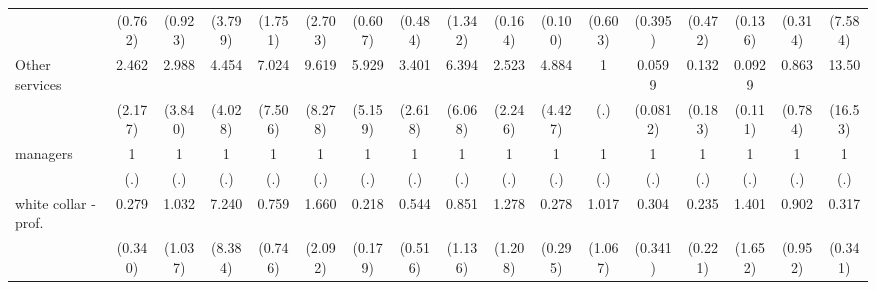 {\begin{tabular}{l*{16}{c}}
                    &     (0.762)         &     (0.923)         &     (3.799)         &     (1.751)         &     (2.703)         &     (0.607)         &     (0.484)         &     (1.342)         &     (0.164)         &     (0.100)         &     (0.603)         &     (0.395)         &     (0.472)         &     (0.136)         &     (0.314)         &     (7.584)         \\
[1em]
Other services      &       2.462         &       2.988         &       4.454         &       7.024         &       9.619\sym{**} &       5.929\sym{*}  &       3.401         &       6.394         &       2.523         &       4.884         &           1         &      0.0599\sym{*}  &       0.132         &      0.0929\sym{*}  &       0.863         &       13.50\sym{*}  \\
                    &     (2.177)         &     (3.840)         &     (4.028)         &     (7.506)         &     (8.278)         &     (5.159)         &     (2.618)         &     (6.068)         &     (2.246)         &     (4.427)         &         (.)         &    (0.0812)         &     (0.183)         &     (0.111)         &     (0.784)         &     (16.53)         \\
[1em]
managers            &           1         &           1         &           1         &           1         &           1         &           1         &           1         &           1         &           1         &           1         &           1         &           1         &           1         &           1         &           1         &           1         \\
                    &         (.)         &         (.)         &         (.)         &         (.)         &         (.)         &         (.)         &         (.)         &         (.)         &         (.)         &         (.)         &         (.)         &         (.)         &         (.)         &         (.)         &         (.)         &         (.)         \\
[1em]
white collar - prof.&       0.279         &       1.032         &       7.240         &       0.759         &       1.660         &       0.218         &       0.544         &       0.851         &       1.278         &       0.278         &       1.017         &       0.304         &       0.235         &       1.401         &       0.902         &       0.317         \\
                    &     (0.340)         &     (1.037)         &     (8.384)         &     (0.746)         &     (2.092)         &     (0.179)         &     (0.516)         &     (1.136)         &     (1.208)         &     (0.295)         &     (1.067)         &     (0.341)         &     (0.221)         &     (1.652)         &     (0.952)         &     (0.341)         \\

\end{tabular}}

